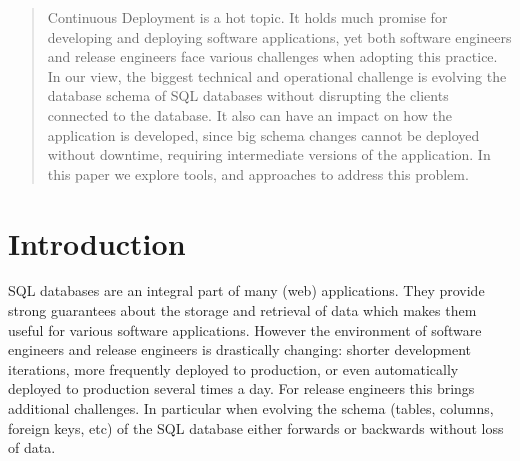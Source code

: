 \documentclass[conference]{IEEEtran}
\begin{document}
\maketitle


\begin{abstract}

Continuous Deployment is a hot topic. It holds much promise for developing and deploying software applications, yet both software engineers and release engineers face various challenges when adopting this practice. In our view, the biggest technical and operational challenge is evolving the database schema of SQL databases without disrupting the clients connected to the database. It also can have an impact on how the application is developed, since big schema changes cannot be deployed without downtime, requiring intermediate versions of the application. In this paper we explore tools, and approaches to address this problem.

\end{abstract}





%
\IEEEpeerreviewmaketitle



\section{Introduction} %


SQL databases are an integral part of many (web) applications. They provide strong guarantees about the storage and retrieval of data which makes them useful for various software applications. However the environment of software engineers and release engineers is drastically changing: shorter development iterations, more frequently deployed to production, or even automatically deployed to production several times a day. For release engineers this brings additional challenges. In particular when evolving the schema (tables, columns, foreign keys, etc) of the SQL database either forwards or backwards without loss of data.
\end{document}

